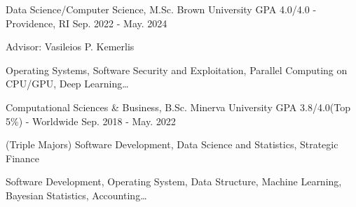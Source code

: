 \begin{cventries}
  \cventry
    {Data Science/Computer Science, M.Sc.}
    {Brown University}
    {GPA 4.0/4.0 - Providence, RI}
    {Sep. 2022 - May. 2024}
    {
    \begin{cvitems}
        \item {Advisor: Vasileios P. Kemerlis}
        \item {Operating Systems, Software Security and Exploitation, Parallel Computing on CPU/GPU, Deep Learning…}
    \end{cvitems}
    }

  \cventry
    {Computational Sciences \& Business, B.Sc.}
    {Minerva University}
    {GPA 3.8/4.0(Top 5\%) - Worldwide}
    {Sep. 2018 - May. 2022}
    {
      \begin{cvitems}
        \item {(Triple Majors) Software Development, Data Science and Statistics, Strategic Finance}
        \item {Software Development, Operating System, Data Structure, Machine Learning, Bayesian Statistics, Accounting…}
      \end{cvitems}
    }
\end{cventries}
